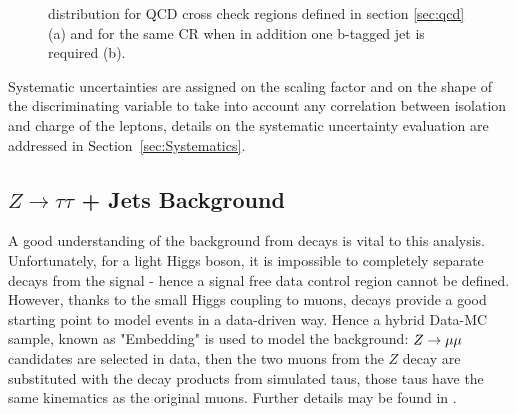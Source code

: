 \begin{figure}[tp]
	\begin{center}
	     
	
	\end{center}
	\caption{\mmc distribution for QCD cross check regions defined in section \ref{sec:qcd} (a) and for the same CR when in addition one b-tagged jet is required (b). }
	\label{fig:ABCD_cr}
\end{figure}


Systematic uncertainties are assigned on the scaling factor \rqcd and on the shape of
the discriminating variable \mmc to take into account any correlation between isolation and charge 
of the leptons, details on the systematic uncertainty evaluation are addressed in Section~\ref{sec:Systematics}.

\subsection{$Z \rightarrow \tau\tau$ + Jets Background}
A good understanding of the background from \Ztautau decays is vital to this
analysis. Unfortunately, for a light Higgs boson, it is impossible to completely separate \Ztautau decays 
from the signal - hence a signal free data control region cannot be defined.
However, thanks to the small Higgs coupling to muons, \Zmumu decays provide a good starting point to 
model \Ztautau events in a data-driven way. Hence a hybrid Data-MC sample, known as "Embedding" is used to model the \Ztautau background: 
$Z\rightarrow \mu\mu$ candidates are selected in data, then the two muons from the $Z$ decay are substituted with the decay 
products from simulated taus, those taus have the same kinematics as the original muons. 
Further details may be found in \cite{Embedding, SMold}.

